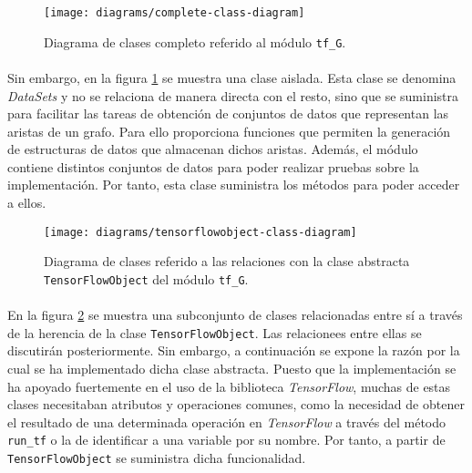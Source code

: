 \documentclass{subfiles}
\begin{document}
          \begin{figure}[h!]
            \centering
            \texttt{[image: diagrams/complete-class-diagram]}
            \caption{Diagrama de clases completo referido al módulo \texttt{tf\_G}.}
            \label{img:class_diagram}
          \end{figure}

          \paragraph{}
          Sin embargo, en la figura \ref{img:class_diagram} se muestra una clase aislada. Esta clase se denomina \emph{DataSets} y no se relaciona de manera directa con el resto, sino que se suministra para facilitar las tareas de obtención de conjuntos de datos que representan las aristas de un grafo. Para ello proporciona funciones que permiten la generación de estructuras de datos que almacenan dichos aristas. Además, el módulo contiene distintos conjuntos de datos para poder realizar pruebas sobre la implementación. Por tanto, esta clase suministra los métodos para poder acceder a ellos.

          \begin{figure}[h!]
            \centering
            \texttt{[image: diagrams/tensorflowobject-class-diagram]}
            \caption{Diagrama de clases referido a las relaciones con la clase abstracta \texttt{TensorFlowObject} del módulo \texttt{tf\_G}.}
            \label{img:tensorflowobject_class_diagram}
          \end{figure}

          \paragraph{}
          En la figura \ref{img:tensorflowobject_class_diagram} se muestra una subconjunto de clases relacionadas entre sí a través de la herencia de la clase \texttt{TensorFlowObject}. Las relacionees entre ellas se discutirán posteriormente. Sin embargo, a continuación se expone la razón por la cual se ha implementado dicha clase abstracta. Puesto que la implementación se ha apoyado fuertemente en el uso de la biblioteca \emph{TensorFlow}, muchas de estas clases necesitaban atributos y operaciones comunes, como la necesidad de obtener el resultado de una determinada operación en \emph{TensorFlow} a través del método \texttt{run\_tf} o la de identificar a una variable por su nombre. Por tanto, a partir de \texttt{TensorFlowObject} se suministra dicha funcionalidad.
\end{document}
